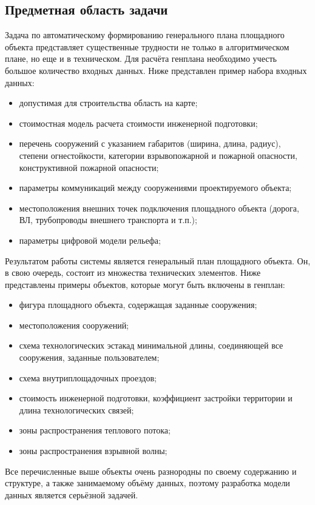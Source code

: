\subsection{\Large{Предметная область задачи}}

Задача по автоматическому формированию генерального плана площадного объекта
представляет существенные трудности не только в алгоритмическом плане, но еще и в техническом.
Для расчёта генплана необходимо учесть большое количество входных данных.
Ниже представлен пример набора входных данных:
\begin{itemize}
    \item допустимая для строительства область на карте;
    \item стоимостная модель расчета стоимости инженерной подготовки;
    \item перечень сооружений с указанием габаритов (ширина, длина, радиус),
    степени огнестойкости, категории взрывопожарной и пожарной опасности, конструктивной пожарной опасности;
    \item параметры коммуникаций между сооружениями проектируемого объекта;
    \item местоположения внешних точек подключения площадного объекта (дорога, ВЛ, трубопроводы внешнего транспорта и т.п.);
    \item параметры цифровой модели рельефа;
\end{itemize}

Результатом работы системы является генеральный план площадного объекта.
Он, в свою очередь, состоит из множества технических элементов.
Ниже представлены примеры объектов, которые могут быть включены в генплан:
\begin{itemize}
    \item фигура площадного объекта, содержащая заданные сооружения;
    \item местоположения сооружений;
    \item схема технологических эстакад минимальной длины, соединяющей все сооружения, заданные пользователем;
    \item схема внутриплощадочных проездов;
    \item стоимость инженерной подготовки, коэффициент застройки территории и длина технологических связей;
    \item зоны распространения теплового потока;
    \item зоны распространения взрывной волны;
\end{itemize}

Все перечисленные выше объекты очень разнородны по своему содержанию и структуре, а также занимаемому объёму данных,
поэтому разработка модели данных является серьёзной задачей.